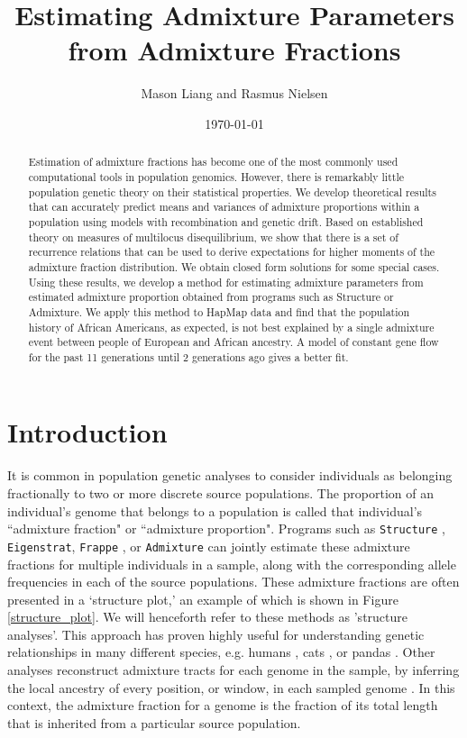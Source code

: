 \documentclass[11pt]{amsart}
\title{Estimating Admixture Parameters from Admixture Fractions}
\author{Mason Liang and Rasmus Nielsen}
\date{\today}
\begin{document}
\begin{abstract}
Estimation of admixture fractions has become one of the most commonly used computational tools in population genomics.  However, there is remarkably little population genetic theory on their statistical properties.  We develop theoretical results that can accurately predict means and variances of admixture proportions within a population using models with recombination and genetic drift. Based on established theory on measures of multilocus disequilibrium, we show that there is a set of recurrence relations that can be used to derive expectations for higher moments of the admixture fraction distribution. We obtain closed form solutions for some special cases. Using these results, we develop a method for estimating admixture parameters from estimated admixture proportion obtained from programs such as Structure or Admixture. We apply this method to HapMap data and find that the population history of African Americans, as expected, is not best explained by a single admixture event between people of European and African ancestry. A model of constant gene flow for the past 11 generations until 2 generations ago gives a better fit.
\end{abstract}
\maketitle

\section*{Introduction}
It is common in population genetic analyses to consider individuals as belonging fractionally to two or more discrete source populations. The proportion of an individual's genome that belongs to a population is called that individual's ``admixture fraction" or ``admixture proportion". Programs such as \verb|Structure| \citep{pritchard2000inference}, \verb|Eigenstrat|, \verb|Frappe| \citep{tang2005estimation}, or \verb|Admixture| \citep{alexander2009fast} can jointly estimate these admixture fractions for multiple individuals in a sample, along with the corresponding  allele frequencies in each of the source populations. These admixture fractions are often presented in a `structure plot,' an example of which is shown in Figure \ref{structure_plot}. We will henceforth refer to these methods as 'structure analyses'. 
This approach has proven highly useful for understanding genetic relationships in many different species, e.g. humans \citep{rosenberg2002genetic}, cats \citep{menotti2008patterns}, or pandas \citep{zhang2007genetic}. Other analyses reconstruct admixture tracts for each genome in the sample, by inferring the local ancestry of every position, or window, in each sampled genome \citep{tang2006reconstructing,maples2013rfmix}. In this context, the admixture fraction for a genome is the fraction of its total length that is inherited from a particular source population. 
\end{document}

